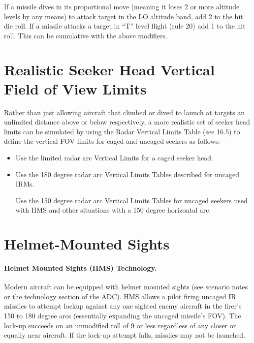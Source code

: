 If a missile dives in its proportional move (meaning it loses 2 or more altitude levels by any means) to attack target in the LO altitude band, add 2 to the hit die roll. If a missile attacks a target in “T” level flight (rule 20) add 1 to the hit roll. This can be cumulative with the above modifiers.


\begin{advancedrules}

\section{Realistic Seeker Head Vertical Field of View Limits}
\label{rule:irm-realistic-vertical-limits}

Rather than just allowing aircraft that climbed or dived to launch at targets an unlimited distance above or below respectively, a more realistic set of seeker head limits can be simulated by using the Radar Vertical Limits Table (see 16.5) to define the vertical FOV limits for caged and uncaged seekers as follows:

\begin{itemize}

    \item Use the limited radar arc Vertical Limits for a caged seeker head.

    \item Use the 180 degree radar arc Vertical Limits Tables described for uncaged IRMs.

     Use the 150 degree radar arc Vertical Limits Tables for uncaged seekers used with HMS and other situations with a 150 degree horizontal arc.

\end{itemize}

\section{Helmet-Mounted Sights}
\label{rule:irm-hms}

\paragraph{Helmet Mounted Sights (HMS) Technology.} Modern aircraft can be equipped with helmet mounted sights (see scenario notes or the technology section of the ADC). HMS allows a pilot firing uncaged IR missiles to attempt lock­up against any one sighted enemy aircraft in the firer's 150 to 180 degree arcs (essentially expanding the uncaged missile's FOV). The lock-up succeeds on an unmodified roll of 9 or less regardless of any closer or equally near aircraft. If the lock-up attempt falls, missiles may not be launched.


\end{advancedrules}
